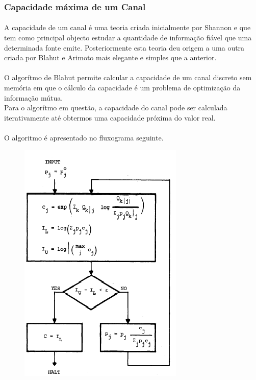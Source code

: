 \documentclass[paper=a4, fontsize=11pt]{scrartcl}
\numberwithin{equation}{section}		%
\numberwithin{figure}{section}			%
\numberwithin{table}{section}				%
\begin{document}

\subsubsection{Capacidade máxima de um Canal}
\paragraph{} A capacidade de um canal é uma teoria criada inicialmente por Shannon e que tem como principal objecto estudar a quantidade de informação fiável que uma determinada fonte emite. Posteriormente esta teoria deu origem a uma outra criada por Blahut e Arimoto mais elegante e simples que a anterior.

\paragraph{}O algorítmo de Blahut permite calcular a capacidade de um canal discreto sem memória em que o cálculo da capacidade é um problema de optimização da informação mútua.
\\
Para o algorítmo em questão, a capacidade do canal pode ser calculada iterativamente até obtermos uma capacidade próxima do valor real.
\paragraph{}  O algoritmo é apresentado no fluxograma seguinte.
\begin{figure}[h!]
\centering
\includegraphics[scale=1.2]{blahut.png}
\end{figure}
\FloatBarrier
\end{document}
